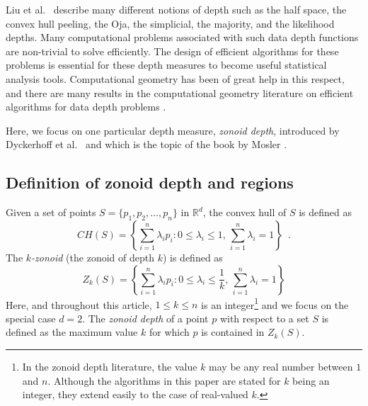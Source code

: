 \documentclass{elsart}
\begin{document}
Liu et al.\ \cite{multivariate_analysis_by_data_depth} describe many
different notions of depth such as the half space, the convex hull
peeling, the Oja, the simplicial, the majority, and the likelihood
depths. Many computational problems associated with such data depth
functions are non-trivial to solve efficiently.  The design of
efficient algorithms for these problems is essential for these depth
measures to become useful statistical analysis tools.  Computational
geometry \cite{preparata_book} has been of great help in this respect,
and there are many results in the computational geometry literature
on efficient algorithms for data depth problems
\cite{regression_depth_and_center_points, aloupis_mcs_thesis,
algorithms_for_bivariate_medians_and_a_fermat_torricelli_problem_for_lines,
an_optimized_randomized_algorithm_for_maximum_tukey_depth,
on_khulls_and_related_problems,
zonoid_data_depth_theory_and_computation,
computing_the_centerpoint_of_a_finite_planar_set_of_points_in_linear_time,
on_a_triangle_counting_problem, langerman_phd_thesis,
the_complexity_of_hyperplane_depth_in_the_plane,
optimization_in_arrangements,
computing_the_center_of_planar_point_sets,
fast_implementation_of_depth_contours_using_topological_sweep,
statistical_algorithms_the_oja_bivariate_median,
efficient_algorithms_for_maximum_regression_depth,
a_lower_bound_for_computing_oja_depth,
on_the_computation_of_the_bivariate_median_and_a_fermat_torricelli_problem,
on_the_convex_layers_of_a_planar_set,
on_algorithms_for_simplicial_depth,
constructing_the_bivariate_tukey_median,
geometry_and_statistics_problems_at_the_interface,
some_new_algorithms_and_software_implementation_methods_for_pattern_recognition_research}.

Here, we focus on one particular depth measure, \emph{zonoid depth},
introduced by Dyckerhoff et al.\
\cite{zonoid_data_depth_theory_and_computation} and which is the topic
of the book by Mosler \cite{mosler_book}.

\subsection{Definition of zonoid depth and regions}
\label{subsection_definition_of_zonoid_depth_and_regions}

Given a set of points $S = \{p_1, p_2,\ldots, p_n\}$ in
$\mathbb{R}^d$, the convex hull of $S$ is defined as 
\[
   CH(S) = \left\{\sum_{i=1}^{n} \lambda_ip_i : 0 \le \lambda_i \le 1,\,
             \sum_{i=1}^{n}{\lambda_i} = 1\right\} \enspace . 
\] 
The \emph{$k$-zonoid} (the zonoid of depth $k$) is defined as
\[
   Z_k(S) = \left\{\sum_{i=1}^{n}\lambda_ip_i : 0 \le \lambda_i \le
             \frac{1}{k},\, \sum_{i=1}^{n}{\lambda_i} = 1\right\}
\] 
Here, and throughout this article, $1 \le k \le n$ is an
integer\footnote{In the zonoid depth literature, the value $k$ may be
any real number between $1$ and $n$. Although the algorithms in this
paper are stated for $k$ being an integer, they extend easily to the
case of real-valued $k$.} and we focus on the special case $d=2$. The
\emph{zonoid depth} of a point $p$ with respect to a set $S$ is
defined as the maximum value $k$ for which $p$ is contained in
$Z_k(S)$.  
\end{document}
